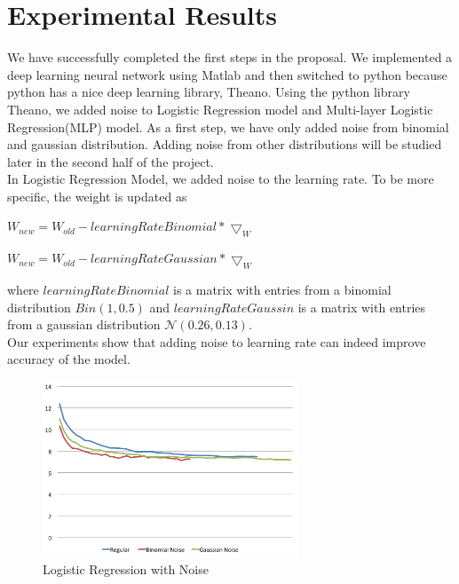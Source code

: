 \section{Experimental Results}
\label{sec:result}

We have successfully completed the first steps in the proposal.
We implemented a deep learning neural network using Matlab and then
switched to python because python has a nice deep learning library,
Theano.
Using the python library Theano, we added noise to Logistic Regression
model and Multi-layer Logistic Regression(MLP) model.
As a first step, we have only added noise from binomial and gaussian
distribution. Adding noise from other distributions will be studied later
in the second half of the project.\\
In Logistic Regression Model, we added noise to the learning rate.
To be more specific, the weight is updated as
\begin{center}
$W_{new} = W_{old} - learningRateBinomial * \bigtriangledown_{W}$
\end{center}
\begin{center}
$W_{new} = W_{old} - learningRateGaussian * \bigtriangledown_{W}$
\end{center}
where $learningRateBinomial$ is a matrix with entries from a binomial
distribution $Bin(1,0.5)$
and $learningRateGaussin$ is a matrix with entries from a gaussian
distribution $\mathcal{N}(0.26,0.13)$.\\
Our experiments show that adding noise to learning rate can indeed
improve accuracy of the model.
\begin{figure}
\caption{Logistic Regression with Noise}
\centering
\includegraphics[width=215pt]{figs/logistic_sgd_all.png}
\end{figure}
